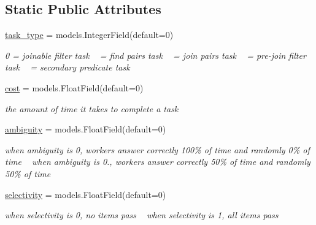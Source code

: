 \subsection*{Static Public Attributes}
\begin{DoxyCompactItemize}
\item 
\mbox{\hyperlink{classjoinapp_1_1models_1_1task__management__models_1_1_task_stats_ab8d9e3d1f9fdf95a31d7b4ce32768eab}{task\+\_\+type}} = models.\+Integer\+Field(default=0)
\begin{DoxyCompactList}\small\item\em 0 = joinable filter task ~ = find pairs task ~ = join pairs task ~ = pre-\/join filter task ~ = secondary predicate task \end{DoxyCompactList}\item 
\mbox{\hyperlink{classjoinapp_1_1models_1_1task__management__models_1_1_task_stats_a6ce3360f2586a441b79b1053cfd2769c}{cost}} = models.\+Float\+Field(default=0)
\begin{DoxyCompactList}\small\item\em the amount of time it takes to complete a task \end{DoxyCompactList}\item 
\mbox{\hyperlink{classjoinapp_1_1models_1_1task__management__models_1_1_task_stats_a829ec2b8120035f51c97cc32f217e148}{ambiguity}} = models.\+Float\+Field(default=0)
\begin{DoxyCompactList}\small\item\em when ambiguity is 0, workers answer correctly 100\% of time and randomly 0\% of time ~\newline
 when ambiguity is 0., workers answer correctly 50\% of time and randomly 50\% of time \end{DoxyCompactList}\item 
\mbox{\hyperlink{classjoinapp_1_1models_1_1task__management__models_1_1_task_stats_af0e245c39a758c26c7eadd206d81ae15}{selectivity}} = models.\+Float\+Field(default=0)
\begin{DoxyCompactList}\small\item\em when selectivity is 0, no items pass ~\newline
 when selectivity is 1, all items pass \end{DoxyCompactList}\item 

\end{DoxyCompactItemize}
